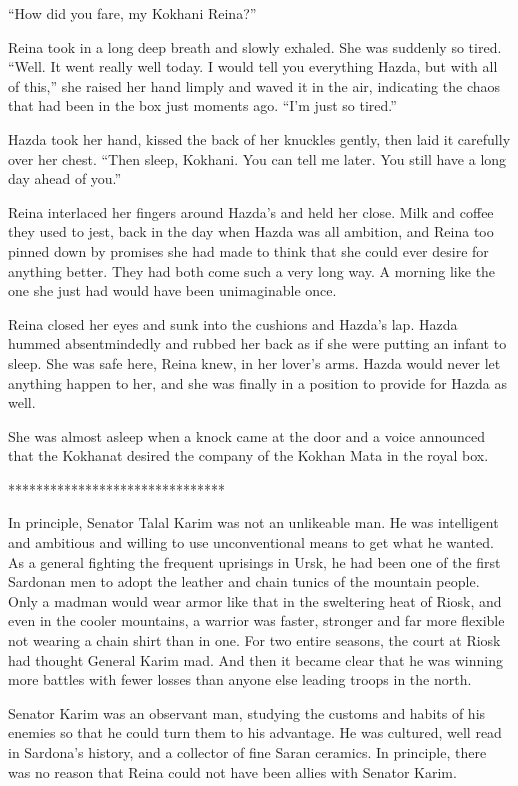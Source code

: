 \documentclass{article}
\begin{document}
	“How did you fare, my Kokhani Reina?” 
	
	Reina took in a long deep breath and slowly exhaled. She was suddenly so tired. “Well. It went really well today. I would tell you everything Hazda, but with all of this,” she raised her hand limply and waved it in the air, indicating the chaos that had been in the box just moments ago. “I’m just so tired.” 
	
	Hazda took her hand, kissed the back of her knuckles gently, then laid it carefully over her chest. “Then sleep, Kokhani. You can tell me later. You still have a long day ahead of you.” 
	
	Reina interlaced her fingers around Hazda’s and held her close. Milk and coffee they used to jest, back in the day when Hazda was all ambition, and Reina too pinned down by promises she had made to think that she could ever desire for anything better. They had both come such a very long way. A morning like the one she just had would have been unimaginable once.
	
	Reina closed her eyes and sunk into the cushions and Hazda’s lap. Hazda hummed absentmindedly and rubbed her back as if she were putting an infant to sleep. She was safe here, Reina knew, in her lover’s arms. Hazda would never let anything happen to her, and she was finally in a position to provide for Hazda as well. 
	
	She was almost asleep when a knock came at the door and a voice announced that the Kokhanat desired the company of the Kokhan Mata in the royal box.
	
	*******************************
	
	In principle, Senator Talal Karim was not an unlikeable man. He was intelligent and ambitious and willing to use unconventional means to get what he wanted. As a general fighting the frequent uprisings in Ursk, he had been one of the first Sardonan men to adopt the leather and chain tunics of the mountain people. Only a madman would wear armor like that in the sweltering heat of Riosk, and even in the cooler mountains, a warrior was faster, stronger and far more flexible not wearing a chain shirt than in one. For two entire seasons, the court at Riosk had thought General Karim mad. And then it became clear that he was winning more battles with fewer losses than anyone else leading troops in the north. 
	
	Senator Karim was an observant man, studying the customs and habits of his enemies so that he could turn them to his advantage. He was cultured, well read in Sardona’s history, and a collector of fine Saran ceramics. In principle, there was no reason that Reina could not have been allies with Senator Karim. 
	
\end{document}
